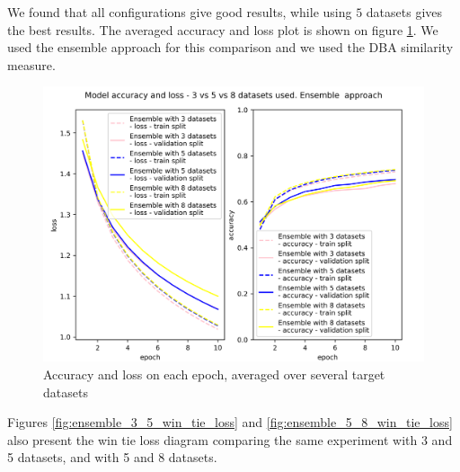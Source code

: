\documentclass[a4paper,11pt,twoside]{report}
\theoremstyle{definition}
\begin{document}
We found that all configurations give good results, while using $5$ datasets gives the best results. The averaged accuracy and loss plot is shown on figure \ref{fig:ensemble_3_5_8}. We used the ensemble approach for this comparison and we used the DBA similarity measure.

\FloatBarrier
\begin{figure}[h!t]
\centering
\includegraphics[width=17cm]{imgs/ensemble_dba_3_vs_5/loss_acc.png}
\caption{Accuracy and loss on each epoch, averaged over several target datasets}
\label{fig:ensemble_3_5_8}
\end{figure}
\FloatBarrier


Figures \ref{fig:ensemble_3_5_win_tie_loss} and
\ref{fig:ensemble_5_8_win_tie_loss} also present the win tie loss diagram comparing the same experiment with 3 and 5 datasets, and with 5 and 8 datasets.
\end{document}
